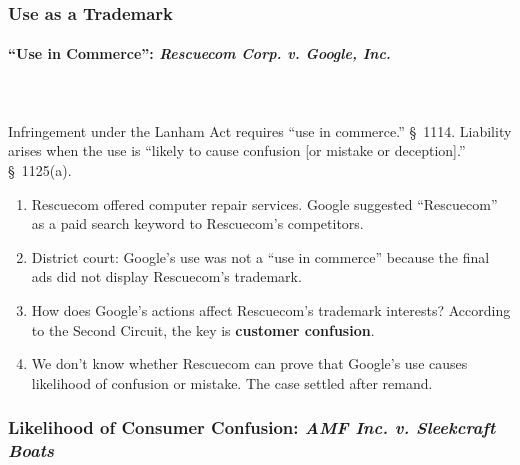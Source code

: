\subsubsection{Use as a Trademark}

\paragraph{``Use in Commerce'': \emph{Rescuecom Corp. v. Google, Inc.}}
~\\\\
Infringement under the Lanham Act requires ``use in commerce.'' \S\ 1114. 
Liability arises when the use is ``likely to cause confusion [or mistake or 
deception].'' \S\ 1125(a). 

\begin{enumerate}
    \item Rescuecom offered computer repair services. Google suggested 
    ``Rescuecom'' as a paid search keyword to Rescuecom's competitors.
    \item District court: Google's use was not a ``use in commerce'' because 
    the final ads did not display Rescuecom's trademark.
    \item How does Google's actions affect Rescuecom's trademark interests? 
    According to the Second Circuit, the key is \textbf{customer confusion}. 
    \item We don't know whether Rescuecom can prove that Google's use causes 
    likelihood of confusion or mistake. The case settled after remand.
\end{enumerate}

\subsubsection{Likelihood of Consumer Confusion: \emph{AMF Inc. v. Sleekcraft 
Boats}}

